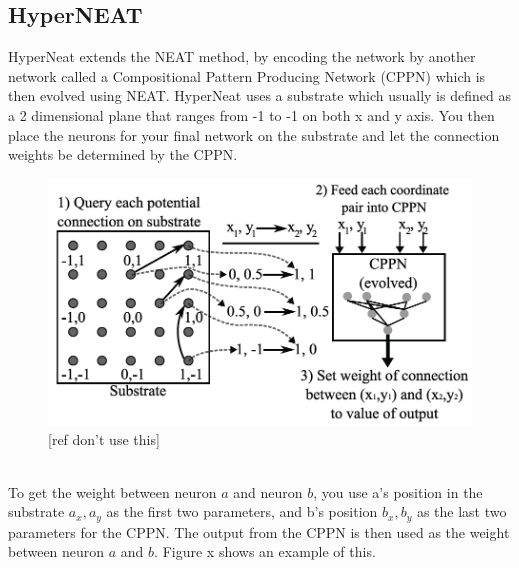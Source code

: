 \subsection{HyperNEAT}
HyperNeat extends the NEAT method, by encoding the network by another network called a Compositional Pattern Producing Network (CPPN) which is then evolved using NEAT. HyperNeat uses a substrate which usually is defined as a 2 dimensional plane that ranges from -1 to -1 on both x and y axis. You then place the neurons for your final network on the substrate and let the connection weights be determined by the CPPN.
\begin{figure}[!ht]
\centering
\includegraphics[scale=0.3]{HyperNeatSubstrate}
\caption{[ref don't use this]}
\end{figure}
\\
To get the weight between neuron $ a $ and neuron $ b $, you use a's position in the substrate $a_x, a_y$ as the first two parameters, and b's position $ b_x, b_y $ as the last two parameters for the CPPN. The output from the CPPN is then used as the weight between neuron $ a $ and $ b $. Figure x shows an example of this.
